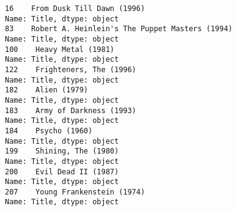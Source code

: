 \documentclass[11pt]{article}
\begin{document}
    \begin{Verbatim}[commandchars=\\\{\}]
16    From Dusk Till Dawn (1996)
Name: Title, dtype: object
83    Robert A. Heinlein's The Puppet Masters (1994)
Name: Title, dtype: object
100    Heavy Metal (1981)
Name: Title, dtype: object
122    Frighteners, The (1996)
Name: Title, dtype: object
182    Alien (1979)
Name: Title, dtype: object
183    Army of Darkness (1993)
Name: Title, dtype: object
184    Psycho (1960)
Name: Title, dtype: object
199    Shining, The (1980)
Name: Title, dtype: object
200    Evil Dead II (1987)
Name: Title, dtype: object
207    Young Frankenstein (1974)
Name: Title, dtype: object

    \end{Verbatim}

    \begin{center}
    \end{center}
    { \hspace*{\fill} \\}
    
    \begin{center}
    \end{center}
    { \hspace*{\fill} \\}
    

    
    
    
    
\end{document}
